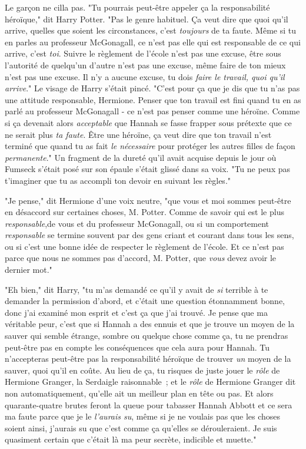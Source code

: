 Le garçon ne cilla pas. "Tu pourrais peut-être appeler ça la responsabilité héroïque," dit Harry Potter. "Pas le genre habituel. Ça veut dire que quoi qu'il arrive, quelles que soient les circonstances, c'est \emph{toujours} de ta faute. Même si tu en parles au professeur McGonagall, ce n'est pas elle qui est responsable de ce qui arrive, c'est \emph{toi}. Suivre le règlement de l'école n'est pas une excuse, être sous l'autorité de quelqu'un d'autre n'est pas une excuse, même faire de ton mieux n'est pas une excuse. Il n'y a aucune excuse, tu dois \emph{faire le travail, quoi qu'il arrive}." Le visage de Harry s'était pincé. "C'est pour ça que je dis que tu n'as pas une attitude responsable, Hermione. Penser que ton travail est fini quand tu en as parlé au professeur McGonagall - ce n'est pas penser comme une héroïne. Comme si ça devenait alors \emph{acceptable} que Hannah se fasse frapper sous prétexte que ce ne serait plus \emph{ta faute}. Être une héroïne, ça veut dire que ton travail n'est terminé que quand tu as fait \emph{le nécessaire} pour protéger les autres filles de façon \emph{permanente}." Un fragment de la dureté qu'il avait acquise depuis le jour où Fumseck s'était posé sur son épaule s'était glissé dans sa voix. "Tu ne peux pas t'imaginer que tu as accompli ton devoir en suivant les règles."

"Je pense," dit Hermione d'une voix neutre, "que vous et moi sommes peut-être en désaccord sur certaines choses, M. Potter. Comme de savoir qui est le plus \emph{responsable},de vous et du professeur McGonagall, ou si un comportement \emph{responsable} se termine souvent par des gens criant et courant dans tous les sens, ou si c'est une bonne idée de respecter le règlement de l'école. Et ce n'est pas parce que nous ne sommes pas d'accord, M. Potter, que \emph{vous} devez avoir le dernier mot."

"Eh bien," dit Harry, "tu m'as demandé ce qu'il y avait de \emph{si} terrible à te demander la permission d'abord, et c'était une question étonnamment bonne, donc j'ai examiné mon esprit et c'est ça que j'ai trouvé. Je pense que ma véritable peur, c'est que si Hannah a des ennuis et que je trouve un moyen de la sauver qui semble étrange, sombre ou quelque chose comme ça, tu ne prendras peut-être pas en compte les conséquences que cela aura pour Hannah. Tu n'accepteras peut-être pas la responsabilité héroïque de trouver \emph{un} moyen de la sauver, quoi qu'il en coûte. Au lieu de ça, tu risques de juste jouer le \emph{rôle} de Hermione Granger, la Serdaigle raisonnable~; et le \emph{rôle} de Hermione Granger dit non automatiquement, qu'elle ait un meilleur plan en tête ou pas. Et alors quarante-quatre brutes feront la queue pour tabasser Hannah Abbott et ce sera ma faute parce que je le \emph{l'aurais su}, même si je ne voulais pas que les choses soient ainsi, j'aurais su que c'est comme ça qu'elles se dérouleraient. Je suis quasiment certain que c'était là ma peur secrète, indicible et muette."

